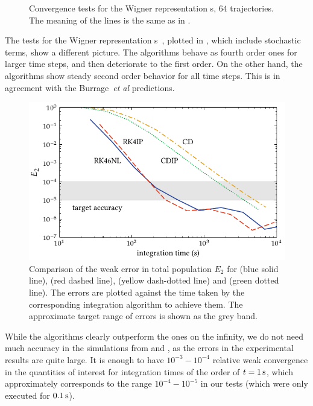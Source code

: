 \begin{figure}
    \caption[Convergence tests, s]{
    Convergence tests for the Wigner representation s, $64$ trajectories.
    The meaning of the lines is the same as in .
    }%

    \label{fig:numerical:convergence-wigner}
\end{figure}

The tests for the Wigner representation s~, plotted in , which include stochastic terms, show a different picture.
The  algorithms behave as fourth order ones for larger time steps, and then deteriorate to the first order.
On the other hand, the  algorithms show steady second order behavior for all time steps.
This is in agreement with the Burrage~\textit{et al} predictions.

\begin{figure}
    \centerline{%
    \includegraphics{figures_generated/test/convergence_by_time.pdf}}%

    \caption[Comparison of integration algorithms]{
    Comparison of the weak error in total population $E_2$ for  (blue solid line),  (red dashed line),  (yellow dash-dotted line) and  (green dotted line).
    The errors are plotted against the time taken by the corresponding integration algorithm to achieve them.
    The approximate target range of errors is shown as the grey band.
    }%

    \label{fig:numerical:convergence-by-time}
\end{figure}

While the  algorithms clearly outperform the  ones on the infinity, we do not need much accuracy in the simulations from  and , as the errors in the experimental results are quite large.
It is enough to have $10^{-3}-10^{-4}$ relative weak convergence in the quantities of interest for integration times of the order of $t=1\mbox{\ensuremath{\,\mathrm{s}}}$, which approximately corresponds to the range $10^{-4}-10^{-5}$ in our tests (which were only executed for $0.1\mbox{\ensuremath{\,\mathrm{s}}}$).

